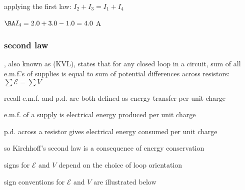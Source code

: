 
\sol applying the first law: $I_2 + I_3 = I_1 + I_4$
	
	\eqskip $\RA I_4 = 2.0 + 3.0 - 1.0 = 4.0$ A \eoe
	


\subsubsection{second law}

\begin{ilight}
	, also known as  (KVL), states that for any closed loop in a circuit, sum of all e.m.f.'s of supplies is equal to sum of potential differences across resistors: $\boxed{\sum \mathcal{E} = \sum V }$
\end{ilight}

\cmt recall e.m.f. and p.d. are both defined as energy transfer per unit charge

e.m.f. of a supply is electrical energy produced per unit charge

p.d. across a resistor gives electrical energy consumed per unit charge

so Kirchhoff's second law is a consequence of energy conservation

\cmt signs for $\mathcal{E}$ and $V$ depend on the choice of loop orientation

sign conventions for $\mathcal{E}$ and $V$ are illustrated below

